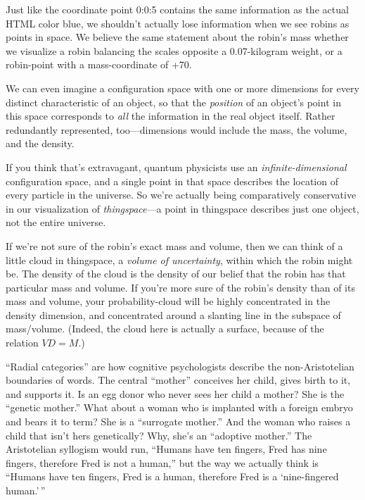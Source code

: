 { Just like the coordinate point 0:0:5 contains the same information
as the actual HTML color blue, we shouldn't actually
lose information when we see robins as points in space. We believe the
same statement about the robin's mass whether we
visualize a robin balancing the scales opposite a 0.07-kilogram weight,
or a robin-point with a mass-coordinate of +70.


 We can even imagine a configuration space with one or more
dimensions for every distinct characteristic of an object, so that the
\textit{position} of an object's point in this space
corresponds to \textit{all} the information in the real object itself.
Rather redundantly represented, too---dimensions would include the
mass, the volume, and the density.


 If you think that's extravagant, quantum
physicists use an \textit{infinite-dimensional} configuration space,
and a single point in that space describes the location of every
particle in the universe. So we're actually being
comparatively conservative in our visualization of
\textit{thingspace}{}---a point in thingspace describes just one
object, not the entire universe.


 If we're not sure of the robin's
exact mass and volume, then we can think of a little cloud in
thingspace, a \textit{volume of uncertainty}, within which the robin
might be. The density of the cloud is the density of our belief that
the robin has that particular mass and volume. If
you're more sure of the robin's density
than of its mass and volume, your probability-cloud will be highly
concentrated in the density dimension, and concentrated around a
slanting line in the subspace of mass/volume. (Indeed, the cloud here
is actually a surface, because of the relation $V D = M$.)


 ``Radial categories'' are how
cognitive psychologists describe the non-Aristotelian boundaries of
words. The central ``mother''
conceives her child, gives birth to it, and supports it. Is an egg
donor who never sees her child a mother? She is the
``genetic mother.'' What about a
woman who is implanted with a foreign embryo and bears it to term? She
is a ``surrogate mother.'' And the
woman who raises a child that isn't hers genetically?
Why, she's an ``adoptive
mother.'' The Aristotelian syllogism would run,
``Humans have ten fingers, Fred has nine fingers,
therefore Fred is not a human,'' but the way we
actually think is ``Humans have ten fingers, Fred is a
human, therefore Fred is a `nine-fingered
human.'\,''


}
